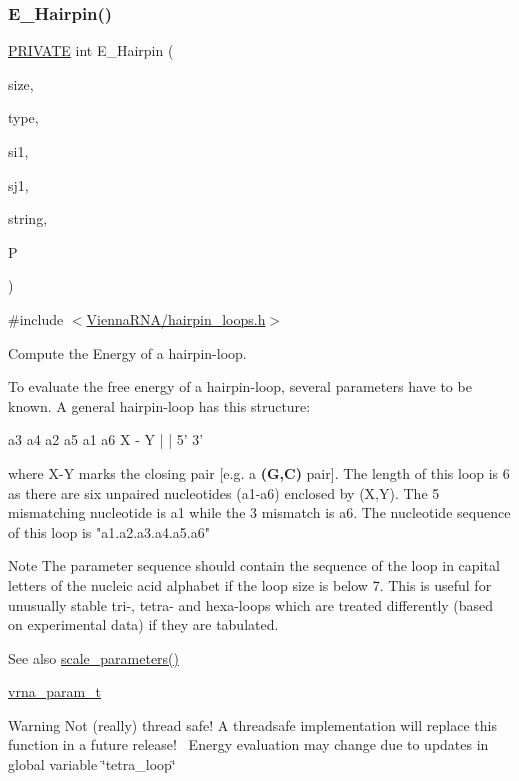 \subsubsection{\texorpdfstring{E\+\_\+\+Hairpin()}{E\_Hairpin()}}
{\footnotesize\ttfamily \mbox{\hyperlink{group__utils_ga5e151c615eda34903514212f05a5ccf8}{P\+R\+I\+V\+A\+TE}} int E\+\_\+\+Hairpin (\begin{DoxyParamCaption}\item[{int}]{size,  }\item[{int}]{type,  }\item[{int}]{si1,  }\item[{int}]{sj1,  }\item[{const char $\ast$}]{string,  }\item[{\mbox{\hyperlink{group__energy__parameters_ga8a69ca7d787e4fd6079914f5343a1f35}{vrna\+\_\+param\+\_\+t}} $\ast$}]{P }\end{DoxyParamCaption})}



{\ttfamily \#include $<$\mbox{\hyperlink{hairpin__loops_8h}{Vienna\+R\+N\+A/hairpin\+\_\+loops.\+h}}$>$}



Compute the Energy of a hairpin-\/loop. 

To evaluate the free energy of a hairpin-\/loop, several parameters have to be known. A general hairpin-\/loop has this structure\+:~\newline
 
\begin{DoxyPre}
      a3 a4
    a2     a5
    a1     a6
      X - Y
      |   |
      5'  3'
\end{DoxyPre}
 where X-\/Y marks the closing pair \mbox{[}e.\+g. a {\bfseries (G,C)} pair\mbox{]}. The length of this loop is 6 as there are six unpaired nucleotides (a1-\/a6) enclosed by (X,Y). The 5\textquotesingle{} mismatching nucleotide is a1 while the 3\textquotesingle{} mismatch is a6. The nucleotide sequence of this loop is "a1.\+a2.\+a3.\+a4.\+a5.\+a6" ~\newline
 \begin{DoxyNote}{Note}
The parameter sequence should contain the sequence of the loop in capital letters of the nucleic acid alphabet if the loop size is below 7. This is useful for unusually stable tri-\/, tetra-\/ and hexa-\/loops which are treated differently (based on experimental data) if they are tabulated. 
\end{DoxyNote}
\begin{DoxySeeAlso}{See also}
\mbox{\hyperlink{group__energy__parameters_ga541f2cf7436e9bc939b0a49b24baf987}{scale\+\_\+parameters()}} 

\mbox{\hyperlink{group__energy__parameters_ga8a69ca7d787e4fd6079914f5343a1f35}{vrna\+\_\+param\+\_\+t}} 
\end{DoxySeeAlso}
\begin{DoxyWarning}{Warning}
Not (really) thread safe! A threadsafe implementation will replace this function in a future release!~\newline
Energy evaluation may change due to updates in global variable \char`\"{}tetra\+\_\+loop\char`\"{}
\end{DoxyWarning}

